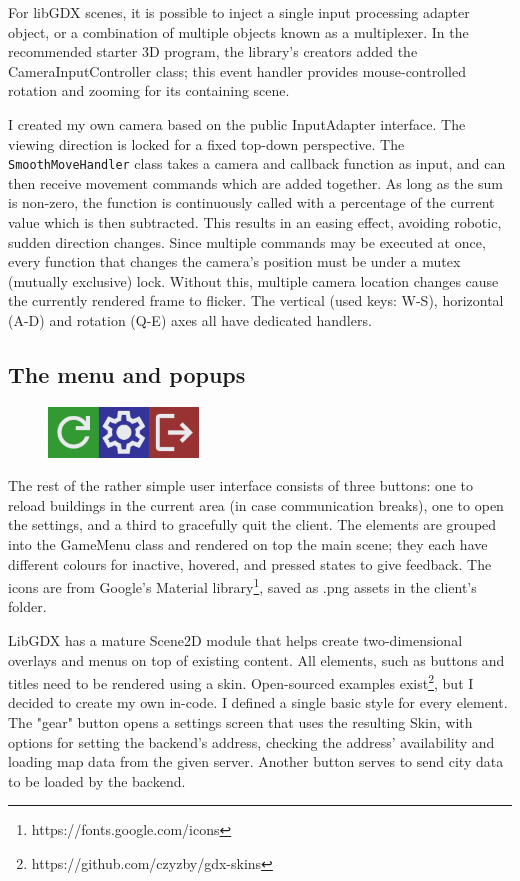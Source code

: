 For libGDX scenes, it is possible to inject a single input processing adapter object, or a combination of multiple objects known as a multiplexer. In the recommended starter 3D program\cite{basic3DlibGDX}, the library's creators added the CameraInputController class; this event handler provides mouse-controlled rotation and zooming for its containing scene.

I created my own camera based on the public InputAdapter interface. The viewing direction is locked for a fixed top-down perspective. The \verb|SmoothMoveHandler| class takes a camera and callback function as input, and can then receive movement commands which are added together. As long as the sum is non-zero, the function is continuously called with a percentage of the current value which is then subtracted. This results in an easing effect, avoiding robotic, sudden direction changes. Since multiple commands may be executed at once, every function that changes the camera's position must be under a mutex (mutually exclusive) lock. Without this, multiple camera location changes cause the currently rendered frame to flicker. The vertical (used keys: W-S), horizontal (A-D) and rotation (Q-E) axes all have dedicated handlers.


\subsection{The menu and popups}

\begin{figure}
    \includegraphics[width=4cm]{images/menu-buttons.png}
    \caption{}
\end{figure} 
The rest of the rather simple user interface consists of three buttons: one to reload buildings in the current area (in case communication breaks), one to open the settings, and a third to gracefully quit the client. The elements are grouped into the GameMenu class and rendered on top the main scene; they each have different colours for inactive, hovered, and pressed states to give feedback. The icons are from Google's Material library\footnote{https://fonts.google.com/icons}, saved as .png assets in the client's folder.

LibGDX has a mature Scene2D module that helps create two-dimensional overlays and menus on top of existing content. All elements, such as buttons and titles need to be rendered using a skin. Open-sourced examples exist\footnote{https://github.com/czyzby/gdx-skins}, but I decided to create my own in-code. I defined a single basic style for every element. The "gear" button opens a settings screen that uses the resulting Skin, with options for setting the backend's address, checking the address' availability and loading map data from the given server. Another button serves to send city data to be loaded by the backend.

